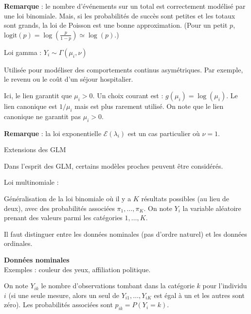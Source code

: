 \documentclass{BeamerTemplate}
\begin{document}
\begin{refsection}
\begin{frame}{}
\textbf{Remarque} : le nombre d'événements sur un total est correctement modélisé par une
loi binomiale. Mais, si les probabilités de succès sont petites et les totaux
sont grands, la loi de Poisson est une bonne approximation. (Pour un petit $p$,
$\mbox{logit}(p) = \log \left(\frac{p}{1-p} \right) \simeq \log(p)$.)
\end{frame}


\begin{frame}{Loi gamma : $Y_i \sim \Gamma(\mu_i,\nu)$}

Utilisée pour modéliser des comportements continus asymétriques. Par exemple, le revenu ou le coût d'un
séjour hospitalier.

\bigskip 
Ici, le lien garantit que $\mu_i>0$. Un choix courant est :
$g(\mu_i) = \log(\mu_i)$. Le lien canonique est $1/\mu_i$ mais est plus rarement
utilisé. On note que le lien canonique ne garantit pas $\mu_i>0$.

\bigskip

\textbf{Remarque} : la loi exponentielle ${\mathcal E}(\lambda_i)$ est un
cas particulier où $\nu=1$.

\end{frame}


\begin{frame}{Extensions des GLM}

Dans l'esprit des GLM, certains modèles proches peuvent être considérés.

\bigskip

{\color{blue}Loi multinomiale :}

\bigskip
Généralisation de la loi binomiale où il y a $K$ résultats
possibles (au lieu de deux), avec des probabilités associées $\pi_1, \ldots,
\pi_K$. On note $Y_i$ la variable aléatoire prenant des valeurs parmi les catégories
$1,\ldots,K$.


\bigskip
Il faut distinguer entre les données {\color{blue}nominales} (pas d'ordre naturel) et 
les données {\color{blue}ordinales}.
\end{frame}


\begin{frame}{}
\textbf{Données nominales}\\
Exemples : couleur des yeux, affiliation politique.

\bigskip
On note $Y_{ik}$ le nombre d'observations tombant dans la catégorie $k$ pour
l'individu $i$ (si une seule mesure, alors un seul de $Y_{i1},\ldots,Y_{iK}$ est
égal à un et les autres sont zéro). Les probabilités associées sont $p_{ik} =
P(Y_i=k)$. 


\end{frame}
\end{refsection}
\end{document}
